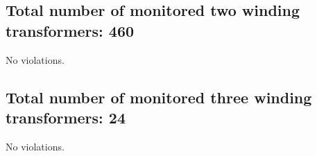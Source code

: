 \documentclass{article}%
\begin{document}
%
\subsection*{Total number of monitored two winding transformers: 460}%
\label{subsec:Totalnumberofmonitoredtwowindingtransformers460}%
No violations.

%
\subsection*{Total number of monitored three winding transformers: 24}%
\label{subsec:Totalnumberofmonitoredthreewindingtransformers24}%
No violations.

%
\end{document}
